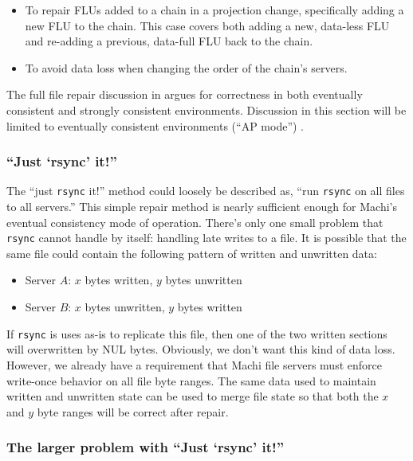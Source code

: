 \documentclass[preprint,10pt]{sigplanconf}
\begin{document}
\begin{itemize}
\item To repair FLUs added to a chain in a projection change,
  specifically adding a new FLU to the chain.  This case covers both
  adding a new, data-less FLU and re-adding a previous, data-full FLU
  back to the chain.
\item To avoid data loss when changing the order of the chain's servers.
\end{itemize}

The full file repair discussion in \cite{machi-chain-manager-design}
argues for correctness in both eventually consistent and strongly
consistent environments.  Discussion in this section will be limited
to eventually consistent environments (``AP mode'') .

\subsubsection{``Just `rsync' it!''}
\label{ssec:just-rsync-it}

The ``just {\tt rsync} it!'' method could loosely be described as,
``run {\tt rsync} on all files to all servers.''  This simple repair
method is nearly sufficient enough for Machi's eventual consistency
mode of operation.  There's only one small problem that {\tt rsync}
cannot handle by itself: handling late writes to a file.  It is
possible that the same file could contain the following pattern of
written and unwritten data:

\begin{itemize}
\item Server $A$: $x$ bytes written, $y$ bytes unwritten
\item Server $B$: $x$ bytes unwritten, $y$ bytes written
\end{itemize}

If {\tt rsync} is uses as-is to replicate this file, then one of the
two written sections will overwritten by NUL bytes.  Obviously, we
don't want this kind of data loss.  However, we already have a
requirement that Machi file servers must enforce write-once behavior
on all file byte ranges.  The same data used to maintain written and
unwritten state can be used to merge file state so that both the $x$
and $y$ byte ranges will be correct after repair.

\subsubsection{The larger problem with ``Just `rsync' it!''}
\end{document}
